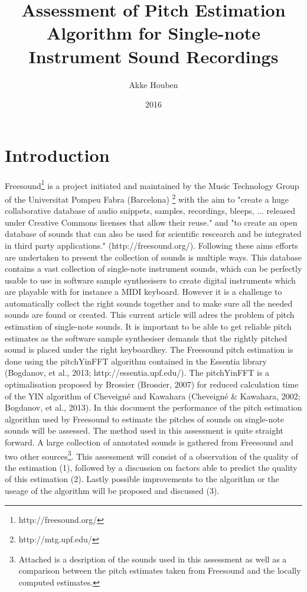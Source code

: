 \documentclass{article}
\title{Assessment of Pitch Estimation Algorithm for Single-note Instrument Sound Recordings}
\author{Akke Houben}
\date{2016}
\begin{document}
\maketitle

\section{Introduction}
Freesound\footnote{http://freesound.org/} is a project initiated and maintained by the Music Technology Group of the Universitat Pompeu Fabra (Barcelona) \footnote{http://mtg.upf.edu/} with the aim to "create a huge collaborative database of audio snippets, samples, recordings, bleeps, ... released under Creative Commons licenses that allow their reuse." and "to create an open database of sounds that can also be used for scientific rescearch and be integrated in third party applications." (http://freesound.org/). Following these aims efforts are undertaken to present the collection of sounds is multiple ways. This database contains a vast collection of single-note instrument sounds, which can be perfectly usable to use in software sample synthesisers to create digital instruments which are playable with for instance a MIDI keyboard. However it is a challenge to automatically collect the right sounds together and to make sure all the needed sounds are found or created. This current article will adres the problem of pitch estimation of single-note sounds. It is important to be able to get reliable pitch estimates as the software sample synthesiser demands that the rightly pitched sound is placed under the right keyboardkey. The Freesound pitch estimation is done using the pitchYinFFT algorithm contained in the Essentia library (Bogdanov, et al., 2013; http://essentia.upf.edu/). The pitchYinFFT is a optimalisation proposed by Brossier (Brossier, 2007) for reduced calculation time of the YIN algorithm of Cheveigné and Kawahara (Cheveigné & Kawahara, 2002; Bogdanov, et al., 2013). 
In this document the performance of the pitch estimation algorithm used by Freesound to estimate the pitches of sounds on single-note sounds will be assessed. The method used in this assessment is quite straight forward. A large collection of annotated sounds is gathered from Freesound and two other sources\footnote{Attached is a desription of the sounds used in this assessment as well as a comparison between the pitch estimates taken from Freesound and the locally computed estimates.}.
 This assessment will consist of a observation of the quality of the estimation (1), followed by a discussion on factors able to predict the quality of this estimation (2). Lastly possible improvements to the algorithm or the useage of the algorithm will be proposed and discussed (3).
\end{document}
